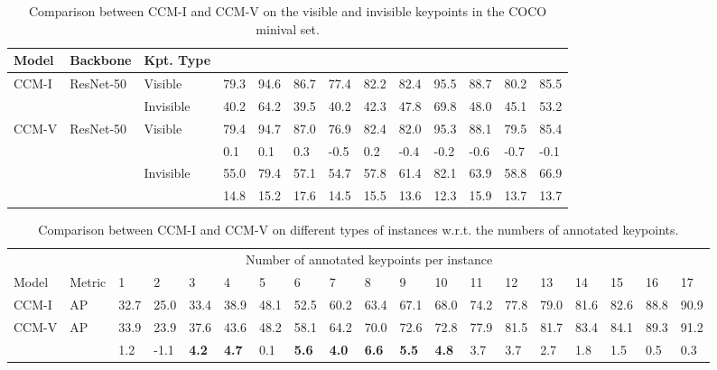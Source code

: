 \documentclass[twocolumn]{svjour3}          \smartqed  \usepackage{natbib}
\begin{document}
\begin{table*}[htbp]
  \centering
  \small
  \caption{Comparison between CCM-I and CCM-V on the visible and invisible keypoints in the COCO minival set.}
    \begin{tabular}{lllllllllllll}
    \toprule
      Model  & Backbone  &   Kpt. Type    &     &   &  &  &  &   &   &  &  &  \\
    \midrule
    \multirow{2}[0]{*}{CCM-I} & \multirow{2}[0]{*}{ResNet-50} & Visible   & 79.3  & 94.6  & 86.7  & 77.4  & 82.2  & 82.4  & 95.5  & 88.7  & 80.2  & 85.5 \\
        \cmidrule{3-13}
        &  & Invisible & 40.2  & 64.2  & 39.5  & 40.2  & 42.3  & 47.8  & 69.8  & 48.0    & 45.1  & 53.2 \\
    \midrule
    \midrule
    \multirow{4}[0]{*}{CCM-V} & \multirow{4}[0]{*}{ResNet-50}& Visible   & 79.4  & 94.7  & 87.0    & 76.9  & 82.4  & 82.0    & 95.3  & 88.1  & 79.5  & 85.4 \\
         & &   & 0.1   & 0.1   & 0.3   & -0.5  & 0.2   & -0.4  & -0.2  & -0.6  & -0.7  & -0.1 \\
          \cmidrule{3-13}
        &  & Invisible & 55.0    & 79.4  & 57.1  & 54.7  & 57.8  & 61.4  & 82.1  & 63.9  & 58.8  & 66.9 \\
         & &   & 14.8  & 15.2  & 17.6  & 14.5  & 15.5  & 13.6  & 12.3  & 15.9  & 13.7  & 13.7 \\
    \bottomrule
    \end{tabular}\label{tab:vis_invis}\end{table*}

\begin{table*}[htbp]
  \centering
  \small
  \caption{Comparison between CCM-I and CCM-V on different types of instances w.r.t. the numbers of annotated keypoints.}
\begin{tabular}{p{1cm}p{0.6cm}p{0.4cm}p{0.6cm}p{0.4cm}p{0.4cm}p{0.4cm}p{0.4cm}p{0.4cm}p{0.4cm}p{0.4cm}p{0.4cm}p{0.4cm}p{0.4cm}p{0.4cm}p{0.4cm}p{0.4cm}p{0.4cm}p{0.4cm}}
    \toprule
    & \multicolumn{17}{c}{Number of annotated keypoints per instance} &\\
    \cmidrule{3-19}
      Model  & Metric & 1     & 2     & 3     & 4     & 5     & 6     & 7     & 8     & 9     & 10    & 11    & 12    & 13    & 14    & 15    & 16    & 17 \\
    \midrule
    CCM-I & AP & 32.7  & 25.0    & 33.4  & 38.9  & 48.1  & 52.5  & 60.2  & 63.4  & 67.1  & 68.0    & 74.2  & 77.8  & 79.0    & 81.6  & 82.6  & 88.8  & 90.9 \\
    \midrule
    \midrule
    \multirow{2}[0]{*}{CCM-V} & AP& 33.9  & 23.9  & 37.6  & 43.6  & 48.2  & 58.1  & 64.2  & 70.0    & 72.6  & 72.8  & 77.9  & 81.5  & 81.7  & 83.4  & 84.1  & 89.3  & 91.2 \\
          & & 1.2   & -1.1  & \textbf{4.2} & \textbf{4.7} & 0.1   & \textbf{5.6} & \textbf{4.0} & \textbf{6.6} & \textbf{5.5} & \textbf{4.8} & 3.7   & 3.7   & 2.7   & 1.8   & 1.5   & 0.5   & 0.3 \\
    \bottomrule
    \end{tabular}\label{tab:ap_kptsNum}\end{table*}
\end{document}

